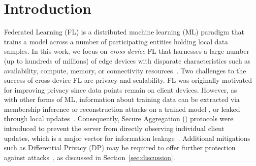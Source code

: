 \section{Introduction}
\label{sec:intro}

Federated Learning (FL) is a distributed machine learning (ML) paradigm that trains a model across a number of participating entities holding local data samples.
In this work, we focus on \emph{cross-device} FL that harnesses a large number (up to hundreds of millions) of edge devices with disparate characteristics such as availability, compute, memory, or connectivity
resources~\cite{kairouz2019advances}. %
Two challenges to the success of cross-device FL are privacy and scalability.
FL was originally motivated for improving privacy since data points remain on client devices.
However, as with other forms of ML, information about training data can be extracted via membership inference or reconstruction attacks on a trained model \cite{carlini2021membership,carlini2020extracting}, or leaked through local updates~\cite{MelisSCS19,geiping2020inverting}.
Consequently, Secure Aggregation (\SecAgg) protocols were introduced to prevent the server from directly observing individual client updates, which is a major vector for information leakage~\cite{bonavitz2019federated,huba2021papaya}.
Additional mitigations such as  Differential Privacy (DP) may be required to offer further protection
against attacks~\cite{dwork2006calibrating,abadi2016deep}, as discussed in Section~\ref{sec:discussion}.

